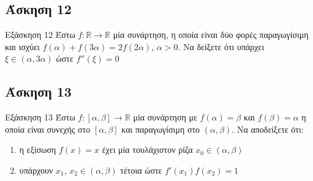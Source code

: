 \documentclass[greek]{beamer}
\begin{document}
\subsection{Άσκηση 12}
\begin{frame}[label=Άσκηση12]{Εξάσκηση 12}
 Έστω $f:\mathbb{R}\to\mathbb{R}$ μία συνάρτηση, η οποία είναι δύο φορές παραγωγίσιμη και ισχύει $f(α)+f(3α)=2f(2α)$, $α>0$. Να δείξετε ότι υπάρχει $ξ\in (α,3α)$ ώστε $f''(ξ)=0$

\end{frame}

\subsection{Άσκηση 13}
\begin{frame}[label=Άσκηση13]{Εξάσκηση 13}
 Έστω $f:[α,β]\to\mathbb{R}$ μία συνάρτηση με $f(α)=β$ και $f(β)=α$ η οποία είναι συνεχής στο $[α,β]$ και παραγωγίσιμη στο $(α,β)$. Να αποδείξετε ότι:
 \begin{enumerate}
   \item<1-> η εξίσωση $f(x)=x$ έχει μία τουλάχιστον ρίζα $x_0\in (α,β)$
   \item<2-> υπάρχουν $x_1$, $x_2\in (α,β)$ τέτοια ώστε $f'(x_1)f(x_2)=1$
 \end{enumerate}

\end{frame}
\end{document}
